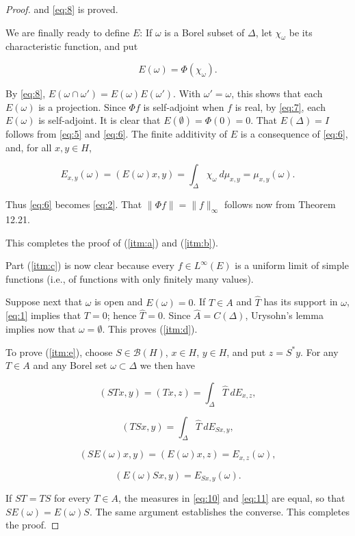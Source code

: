 \begin{proof}
  and \eqref{eq:8} is proved.

  We are finally ready to define \( E \): If \( \omega \) is a Borel subset of \( \Delta \), let
  \( \chi_{\omega} \) be its characteristic function, and put

  \[
    E(\omega) = \Phi(\chi_{\omega}).
  \]

  By \eqref{eq:8}, \( E(\omega \cap \omega') = E(\omega)E(\omega') \).
  With \( \omega' = \omega \), this shows that
  each \( E(\omega) \) is a projection.
  Since \( \Phi f \) is self-adjoint when \( f \) is real, by \eqref{eq:7},
  each \( E(\omega) \) is self-adjoint.
  It is clear that \( E(\emptyset) = \Phi(0) = 0 \).
  That
  \( E(\Delta) = I \) follows from \eqref{eq:5} and \eqref{eq:6}.
  The finite additivity of \( E \) is a consequence
  of \eqref{eq:6}, and, for all \( x, y \in H \),

  \[
    E_{x,y}(\omega) = (E(\omega)x, y) = \int_{\Delta} \chi_{\omega} \ d\mu_{x,y} = \mu_{x,y}(\omega).
  \]

  Thus \eqref{eq:6} becomes \eqref{eq:2}.
  That \( \|\Phi f\| = \|f\|_{\infty} \) follows now from Theorem 12.21.

  This completes the proof of (\ref{itm:a}) and (\ref{itm:b}).

  Part (\ref{itm:c}) is now clear because every \( f \in L^{\infty}(E) \) is a uniform limit of
  simple functions (i.e., of functions with only finitely many values).

  Suppose next that \( \omega \) is open and \( E(\omega) = 0 \).
  If \( T \in A \) and \( \widehat{T} \) has
  its support in \( \omega \), \eqref{eq:1} implies that \( T = 0 \); hence \( \widehat{T} = 0 \).
  Since \( \widehat{A} = C(\Delta) \),
  Urysohn's lemma implies now that \( \omega = \emptyset \).
  This proves (\ref{itm:d}).

  To prove (\ref{itm:e}), choose \( S \in \mathcal{B}(H) \), \( x \in H \), \( y \in H \), and put \( z = S^* y \).
  For any \( T \in A \) and any Borel set \( \omega \subset \Delta \) we then have

  \begin{equation}
    \label{eq:10}
    (STx, y) = (Tx, z) = \int_{\Delta} \widehat{T} \ dE_{x,z},
  \end{equation}

  \begin{equation}
    \label{eq:11}
    (TSx, y) = \int_{\Delta} \hat{T} \ dE_{Sx,y},
  \end{equation}

  \[
    (SE(\omega)x, y) = (E(\omega)x, z) = E_{x,z}(\omega),
  \]

  \[
    (E(\omega)Sx, y) = E_{Sx,y}(\omega).
  \]

  If \( ST = TS \) for every \( T \in A \), the measures in \eqref{eq:10} and \eqref{eq:11} are
  equal, so that \( SE(\omega) = E(\omega)S \).
  The same argument establishes the converse.
  This completes the proof.
\end{proof}
